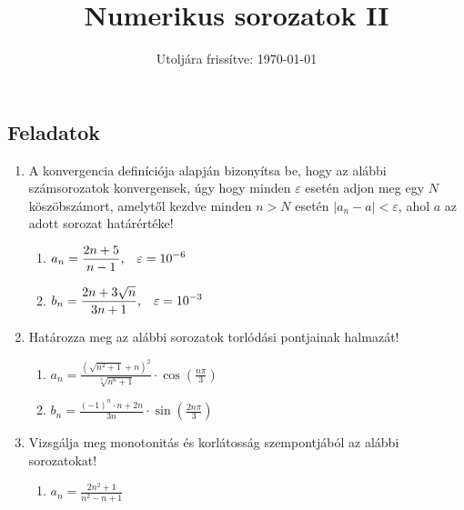 \documentclass[a4paper, 12pt]{scrartcl}
\title{Numerikus sorozatok II}
\date{Utoljára frissítve: \today}
\begin{document}
\maketitle

\subsection{Feladatok}

\begin{enumerate}
  \item A konvergencia definíciója alapján bizonyítsa be, hogy az alábbi
        számsorozatok konvergensek, úgy hogy minden $\varepsilon$ esetén adjon
        meg egy $N$ köszöbszámort, amelytől kezdve minden $n > N$ esetén
        $|a_n - a| < \varepsilon$, ahol $a$ az adott sorozat határértéke!
        \begin{enumerate}
          \item $\displaystyle
                  a_n = \frac{2n + 5}{n - 1}
                  \text,\quad
                  \varepsilon = 10^{-6}
                $

          \item $\displaystyle
                  b_n = \frac{2n + 3 \sqrt{n}}{3n + 1}
                  \text,\quad
                  \varepsilon = 10^{-3}
                $
        \end{enumerate}

  \item Határozza meg az alábbi sorozatok torlódási pontjainak halmazát!
        \begin{enumerate}
          \item $\displaystyle
                  a_n = \frac{\left(
                    \sqrt{n^2 + 1} + n
                    \right)^2}{
                    \sqrt[3]{n^6 + 1}
                  } \cdot \cos\left(
                  \frac{n\pi}{3}
                  \right)
                $

          \item $\displaystyle
                  b_n = \frac{(-1)^n \cdot n + 2n}{3n} \cdot \sin\left(
                  \frac{2n\pi}{3}
                  \right)
                $
        \end{enumerate}

  \item Vizsgálja meg monotonitás és korlátosság szempontjából az alábbi
        sorozatokat!
        \begin{enumerate}
          \item $\displaystyle
                  a_n = \frac{2n^2 + 1}{n^2 - n + 1}
                $


\end{enumerate}
\end{enumerate}
\end{document}
